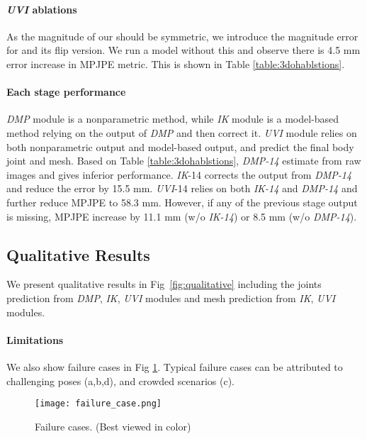 \documentclass[10pt,twocolumn,letterpaper]{article}
\begin{document}
\paragraph{\textit{UVI} ablations} As the magnitude of our  should be symmetric, we introduce the magnitude error for  and its flip version.  We run a model without this  and  observe there is 4.5 mm error increase in MPJPE metric. This is shown in Table \ref{table:3dohablstions}. 

\paragraph{Each stage performance} \textit{DMP} module is a nonparametric method, while \textit{IK} module is a model-based method relying on the output of \textit{DMP} and then correct it. \textit{UVI} module relies on both nonparametric output and model-based output, and predict the final body joint and mesh. Based on Table \ref{table:3dohablstions}, \textit{DMP-14} estimate from raw images and gives inferior performance.  \textit{IK}-14 corrects the output from \textit{DMP-14} and reduce the error by 15.5 mm. \textit{UVI}-14 relies on both \textit{IK-14} and \textit{DMP-14} and further reduce MPJPE to 58.3 mm. However, if any of the previous stage output is missing, MPJPE increase by 11.1 mm (w/o \textit{IK-14}) or 8.5 mm (w/o \textit{DMP-14}).















\subsection{Qualitative Results} 
We present qualitative results in Fig~\ref{fig:qualitative} including the joints prediction from \textit{DMP}, \textit{IK}, \textit{UVI} modules and mesh prediction from \textit{IK}, \textit{UVI} modules. 

\paragraph{Limitations} We also show failure cases in Fig \ref{fig:failurecases}. Typical failure cases can be attributed to challenging poses (a,b,d), and crowded scenarios (c). 

\begin{figure}
\centering
\texttt{[image: failure\_case.png]}
\caption{Failure cases. (Best viewed in color) }
\label{fig:failurecases}
\end{figure}
\end{document}
